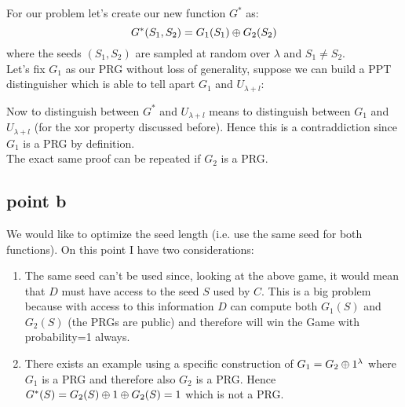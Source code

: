 \documentclass[11pt]{article}
\newcounter{t0d0_counter}
\begin{document}
For our problem let's create our new function $G^*$ as: 
$$G^{*}(S_1, S_2)=G_{1}(S_1) \oplus G_{2}(S_2)$$
where the seeds $(S_1, S_2) $ are sampled at random over $\lambda$ and $S_1 \neq S_2$.\\

Let's fix $G_{1}$ as our PRG without loss of generality, suppose we can build a PPT distinguisher which is able to tell apart $G_1$ and $U_{\lambda+l}$:

\begin{figure}[h!]
   \centering
   \sdinit{}
\end{figure}

Now to distinguish between $G^*$ and $U_{\lambda+l}$ means to distinguish between $G_1$ and $U_{\lambda+l}$ (for the xor property discussed before). Hence this is a contraddiction since $G_1$ is a PRG by definition. \\ 
The exact same proof can be repeated if $G_{2}$ is a PRG.

\newpage
\subsection{point b}

We would like to optimize the seed length (i.e. use the same seed for both functions). On this point I have two considerations:
\begin{enumerate}
   \item The same seed can't be used since, looking at the above game, it would mean that $D$ must have access to the seed $S$ used by $C$. This is a big problem because with access to this information $D$ can compute both $G_1(S)$ and $G_2(S)$ (the PRGs are public) and therefore will win the Game with probability=1 always.
   \item There exists an example using a specific construction of $G_{1}=G_{2} \oplus 1^{\lambda} $ where $G_1$ is a PRG and therefore also $G_2$ is a PRG.
   Hence $G^{*}(S)= G_{2}(S) \oplus 1 \oplus G_{2}(S) = 1$ which is not a PRG. 
\end{enumerate}
\end{document}
